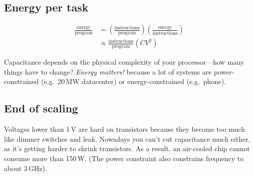 \subsection{Energy per task}
\begin{align}
\frac{\text{energy}}{\text{program}}
&= \left(\frac{\text{instructions}}{\text{program}}\right)
\left(\frac{\text{energy}}{\text{isntructions}}\right)\\
& \propto \frac{\text{instructions}}{\text{program}}
\left(CV^2\right)
\end{align}

Capacitance depends on the physical complexity of your processor---how many things have to change?
\emph{Energy matters!} because a lot of systems are power-constrained (e.g.~20\,MW datacenter) or energy-constrained (e.g.~phone).

\subsection{End of scaling}
Voltages lower than 1\,V are hard on transistors because they become too much like dimmer switches and leak. Nowadays you can't cut capacitance much either, as it's getting harder to shrink transistors. As a result, an air-cooled chip cannot consume more than 150\,W. (The power constraint also constrains frequency to about 3\,GHz).